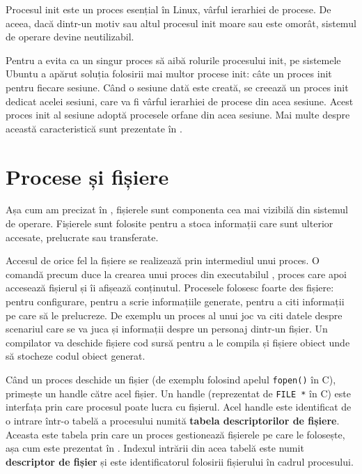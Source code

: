 Procesul init este un proces esențial în Linux, vârful ierarhiei de procese. De
aceea, dacă dintr-un motiv sau altul procesul init moare sau este omorât,
sistemul de operare devine neutilizabil.

Pentru a evita ca un singur proces să aibă rolurile procesului init, pe
sistemele Ubuntu a apărut soluția folosirii mai multor procese init: câte un
proces init pentru fiecare sesiune. Când o sesiune dată este creată, se creează
un proces init dedicat acelei sesiuni, care va fi vârful ierarhiei de procese
din acea sesiune. Acest proces init al sesiune adoptă procesele orfane din acea
sesiune. Mai multe despre această caracteristică sunt prezentate în .

\section{Procese și fișiere}
\label{sec:process:files}

Așa cum am precizat în ,
fișierele sunt componenta cea mai vizibilă din sistemul de operare. Fișierele
sunt folosite pentru a stoca informații care sunt ulterior accesate, prelucrate
sau transferate.

Accesul de orice fel la fișiere se realizează prin intermediul unui proces. O
comandă precum  duce la crearea unui proces din executabilul ,
proces care apoi accesează fișierul  și îi afișează conținutul. Procesele
folosesc foarte des fișiere: pentru configurare, pentru a scrie informațiile
generate, pentru a citi informații pe care să le prelucreze. De exemplu un
proces al unui joc va citi datele despre scenariul care se va juca și informații
despre un personaj dintr-un fișier. Un compilator va deschide fișiere cod sursă
pentru a le compila și fișiere obiect unde să stocheze codul obiect generat.

Când un proces deschide un fișier (de exemplu folosind apelul \texttt{fopen()} în C),
primește un handle către acel fișier. Un handle (reprezentat de \texttt{FILE *} în C)
este interfața prin care procesul poate lucra cu fișierul. Acel handle este
identificat de o intrare într-o tabelă a procesului numită \textbf{tabela descriptorilor
de fișiere}. Aceasta este tabela prin care un proces gestionează fișierele pe
care le folosește, așa cum este prezentat în .
Indexul intrării din acea tabelă este numit \textbf{descriptor de fișier} și este identificatorul folosirii
fișierului în cadrul procesului.

